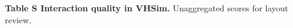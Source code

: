 \documentclass[10pt]{article}
\begin{document}
\newcommand{\ivgnotes}{}
\renewcommand{\ivgnote}[1]{\gdef\ivgnotes{#1}}

\par\vspace{6pt}
{\fontsize{8.8}{10.3}\selectfont\textsf{\textbf{Table S Interaction quality in VHSim.}} Unaggregated scores for layout review. \ivgnotes\par}
\end{document}
